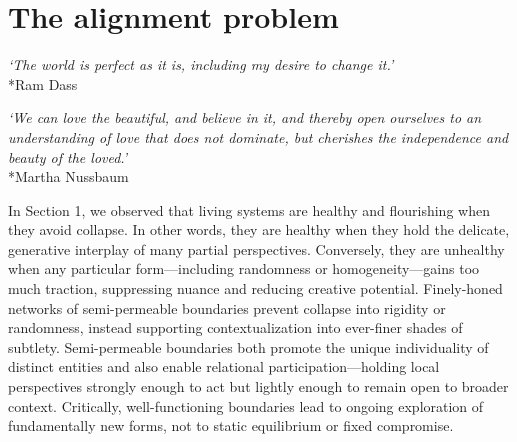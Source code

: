 \documentclass[11pt]{article}
\begin{document}



\section{The alignment problem}

\begin{center}
\textit{`The world is perfect as it is, including my desire to change it.'}\\*Ram Dass
\end{center}

\begin{center}
\textit{`We can love the beautiful, and believe in it, and thereby open ourselves to an understanding of love that does not dominate, but cherishes the independence and beauty of the loved.'}\\*Martha Nussbaum
\end{center}



In Section 1, we observed that living systems are healthy and flourishing when they avoid collapse. In other words, they are healthy when they hold the delicate, generative interplay of many partial perspectives. Conversely, they are unhealthy when any particular form---including randomness or homogeneity---gains too much traction, suppressing nuance and reducing creative potential. Finely-honed networks of semi-permeable boundaries prevent collapse into rigidity or randomness, instead supporting contextualization into ever-finer shades of subtlety. Semi-permeable boundaries both promote the unique individuality of distinct entities and also enable relational participation---holding local perspectives strongly enough to act but lightly enough to remain open to broader context. Critically, well-functioning boundaries lead to ongoing exploration of fundamentally new forms, not to static equilibrium or fixed compromise.
\end{document}
